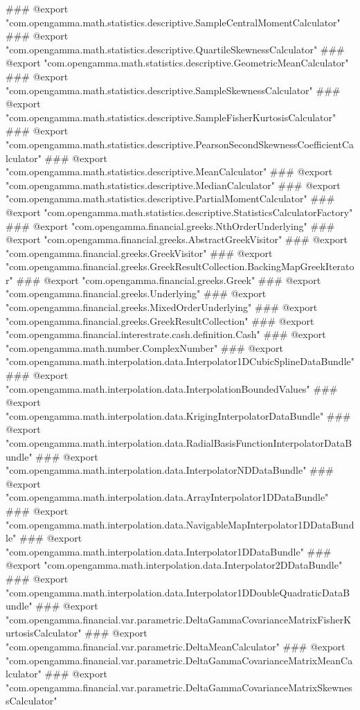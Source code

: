 ### @export "com.opengamma.math.statistics.descriptive.SampleCentralMomentCalculator"
### @export "com.opengamma.math.statistics.descriptive.QuartileSkewnessCalculator"
### @export "com.opengamma.math.statistics.descriptive.GeometricMeanCalculator"
### @export "com.opengamma.math.statistics.descriptive.SampleSkewnessCalculator"
### @export "com.opengamma.math.statistics.descriptive.SampleFisherKurtosisCalculator"
### @export "com.opengamma.math.statistics.descriptive.PearsonSecondSkewnessCoefficientCalculator"
### @export "com.opengamma.math.statistics.descriptive.MeanCalculator"
### @export "com.opengamma.math.statistics.descriptive.MedianCalculator"
### @export "com.opengamma.math.statistics.descriptive.PartialMomentCalculator"
### @export "com.opengamma.math.statistics.descriptive.StatisticsCalculatorFactory"
### @export "com.opengamma.financial.greeks.NthOrderUnderlying"
### @export "com.opengamma.financial.greeks.AbstractGreekVisitor"
### @export "com.opengamma.financial.greeks.GreekVisitor"
### @export "com.opengamma.financial.greeks.GreekResultCollection.BackingMapGreekIterator"
### @export "com.opengamma.financial.greeks.Greek"
### @export "com.opengamma.financial.greeks.Underlying"
### @export "com.opengamma.financial.greeks.MixedOrderUnderlying"
### @export "com.opengamma.financial.greeks.GreekResultCollection"
### @export "com.opengamma.financial.interestrate.cash.definition.Cash"
### @export "com.opengamma.math.number.ComplexNumber"
### @export "com.opengamma.math.interpolation.data.Interpolator1DCubicSplineDataBundle"
### @export "com.opengamma.math.interpolation.data.InterpolationBoundedValues"
### @export "com.opengamma.math.interpolation.data.KrigingInterpolatorDataBundle"
### @export "com.opengamma.math.interpolation.data.RadialBasisFunctionInterpolatorDataBundle"
### @export "com.opengamma.math.interpolation.data.InterpolatorNDDataBundle"
### @export "com.opengamma.math.interpolation.data.ArrayInterpolator1DDataBundle"
### @export "com.opengamma.math.interpolation.data.NavigableMapInterpolator1DDataBundle"
### @export "com.opengamma.math.interpolation.data.Interpolator1DDataBundle"
### @export "com.opengamma.math.interpolation.data.Interpolator2DDataBundle"
### @export "com.opengamma.math.interpolation.data.Interpolator1DDoubleQuadraticDataBundle"
### @export "com.opengamma.financial.var.parametric.DeltaGammaCovarianceMatrixFisherKurtosisCalculator"
### @export "com.opengamma.financial.var.parametric.DeltaMeanCalculator"
### @export "com.opengamma.financial.var.parametric.DeltaGammaCovarianceMatrixMeanCalculator"
### @export "com.opengamma.financial.var.parametric.DeltaGammaCovarianceMatrixSkewnessCalculator"
